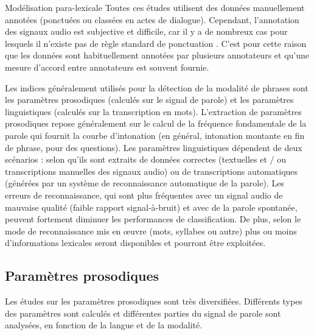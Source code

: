 \documentclass{style/these}
\let\oldcite=\cite
\renewcommand{\cite}[1]{{\fontfamily{qcs}\selectfont{\color{darkerblue}[\oldcite{#1}]}}}
\begin{document}
\begin{part}{Modélisation para-lexicale}
Toutes ces études utilisent des données manuellement annotées (ponctuées ou classées en actes de dialogue). 
Cependant, l'annotation des signaux audio est subjective et difficile, car il y a de nombreux cas pour lesquels il n'existe pas de règle standard de ponctuation \cite{Kolar:2011}. 
C'est pour cette raison que les données sont habituellement annotées par plusieurs annotateurs et qu'une mesure d'accord entre annotateurs est souvent fournie. 

Les indices généralement utilisés pour la détection de la modalité de phrases sont les paramètres prosodiques (calculés sur le signal de parole) et les paramètres linguistiques (calculés sur la transcription en mots). 
L'extraction de paramètres prosodiques repose généralement sur le calcul de la fréquence fondamentale de la parole qui fournit la courbe d'intonation (en général, intonation montante en fin de phrase, pour des questions).
Les paramètres linguistiques dépendent de deux scénarios : selon qu'ils sont extraits de données correctes (textuelles et / ou transcriptions manuelles des signaux audio) ou de transcriptions automatiques (générées par un système de reconnaissance automatique de la parole). 
Les erreurs de reconnaissance, qui sont plus fréquentes avec un signal audio de mauvaise qualité (faible rapport signal-à-bruit) et avec de la parole spontanée, peuvent fortement diminuer les performances de classification. 
De plus, selon le mode de reconnaissance mis en œuvre (mots, syllabes ou autre) plus ou moins d'informations lexicales seront disponibles et pourront être exploitées. 

\subsection*{Paramètres prosodiques}
\renewcommand{\rightmark}{Paramètres prosodiques}

Les études sur les paramètres prosodiques sont très diversifiées. 
Différents types des paramètres sont calculés et différentes parties du signal de parole sont analysées, en fonction de la langue et de la modalité.


\end{part}
\end{document}
